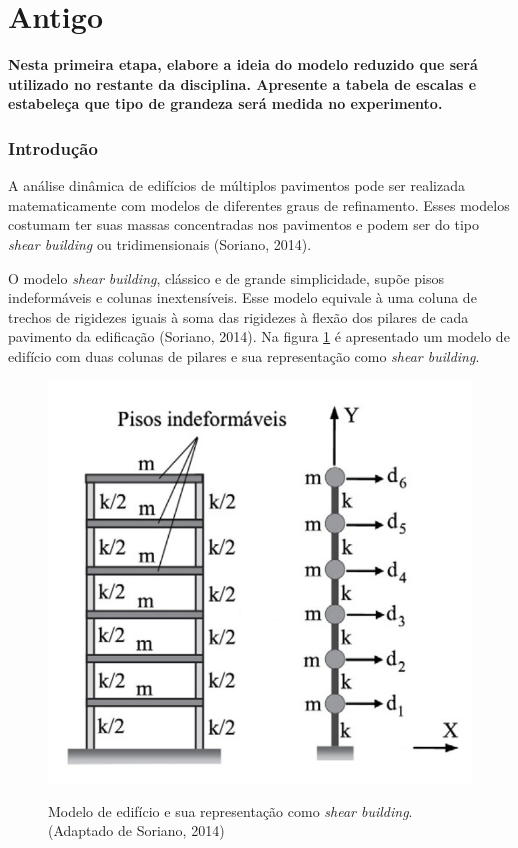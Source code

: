 \pagebreak \part{Antigo}

\textbf{Nesta primeira etapa, elabore a ideia do modelo reduzido que será utilizado no restante da disciplina. Apresente a tabela de escalas e estabeleça que tipo de grandeza será medida no experimento.}

\section{Introdução}

A análise dinâmica de edifícios de múltiplos pavimentos pode ser realizada matematicamente com modelos de diferentes graus de refinamento. Esses modelos costumam ter suas massas concentradas nos pavimentos e podem ser do tipo \textit{shear building} ou tridimensionais (Soriano, 2014).

O modelo \textit{shear building}, clássico e de grande simplicidade, supõe pisos indeformáveis e colunas inextensíveis. Esse modelo equivale à uma coluna de trechos de rigidezes iguais à soma das rigidezes à flexão dos pilares de cada pavimento da edificação (Soriano, 2014). Na figura \ref{fig:shearb} é apresentado um modelo de edifício com duas colunas de pilares e sua representação como \textit{shear building}.


\begin{figure}
	\centering
	\caption{Modelo de edifício e sua representação como \textit{shear building}.\\ \small{(Adaptado de Soriano, 2014)}}
	\includegraphics[scale=0.39]{../Images/ShearBuilding}
	\label{fig:shearb}
\end{figure}


